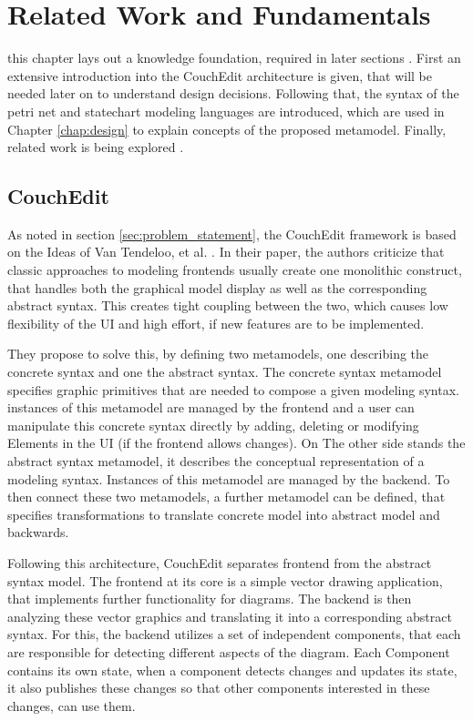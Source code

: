\chapter{Related Work and Fundamentals}

this chapter lays out a knowledge foundation, required in later sections . First an extensive introduction into the CouchEdit architecture is given, that will be needed later on to understand design decisions. Following that, the syntax of the petri net and statechart modeling languages are introduced, which are used in Chapter \ref{chap:design} to explain concepts of the proposed metamodel. Finally, related work is being explored . 

\section{CouchEdit}
As noted in section \ref{sec:problem_statement}, the CouchEdit framework is based on the Ideas of Van Tendeloo, et al. \cite{van_tendeloo_concrete_2017}. In their paper, the authors criticize that classic approaches to modeling frontends usually create one monolithic construct, that handles both the graphical model display as well as the corresponding abstract syntax. This creates tight coupling between the two, which causes low flexibility of the UI and high effort, if new features are to be implemented. 

They propose to solve this, by defining two metamodels, one describing the concrete syntax and one the abstract syntax. The concrete syntax metamodel specifies graphic primitives that are needed to compose a given modeling syntax. instances of this metamodel are managed by the frontend and a user can manipulate this concrete syntax directly by adding, deleting or modifying Elements in the UI (if the frontend allows changes). On The other side stands the abstract syntax metamodel, it describes the conceptual representation of a modeling syntax. Instances of this metamodel are managed by the backend. To then connect these two metamodels, a further metamodel can be defined, that specifies transformations to translate concrete model into abstract model and backwards. 

Following this architecture, CouchEdit separates frontend from the abstract syntax model. The frontend at its core is a simple vector drawing application, that implements further functionality for diagrams. The backend is then analyzing these vector graphics and translating it into a corresponding abstract syntax. For this, the backend utilizes a set of independent components, that each are responsible for detecting different aspects of the diagram. Each Component contains its own state, when a component detects changes and updates its state, it also publishes these changes so that other components interested in these changes, can use them.  

